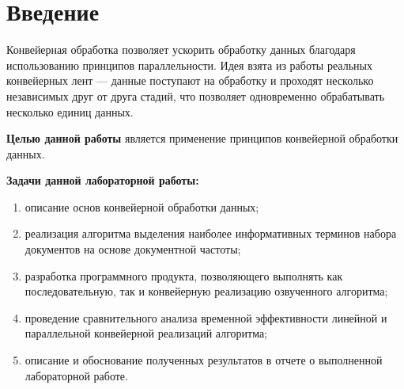 \chapter*{Введение}

Конвейерная обработка позволяет ускорить обработку данных благодаря использованию принципов параллельности. Идея взята из работы реальных конвейерных лент — данные поступают на обработку и проходят несколько независимых друг от друга стадий, что позволяет одновременно обрабатывать несколько единиц данных.

\textbf{Целью данной работы} является применение принципов конвейерной обработки данных.

\textbf{Задачи данной лабораторной работы:}
\begin{enumerate}
	\item описание основ конвейерной обработки данных;
	\item реализация алгоритма выделения наиболее информативных терминов набора документов на основе документной частоты;
	\item разработка программного продукта, позволяющего выполнять как последовательную, так и конвейерную реализацию озвученного алгоритма;
	\item проведение сравнительного анализа временной эффективности линейной и параллельной конвейерной реализаций алгоритма;
	\item описание и обоснование полученных результатов в отчете о выполненной лабораторной работе.
\end{enumerate}
